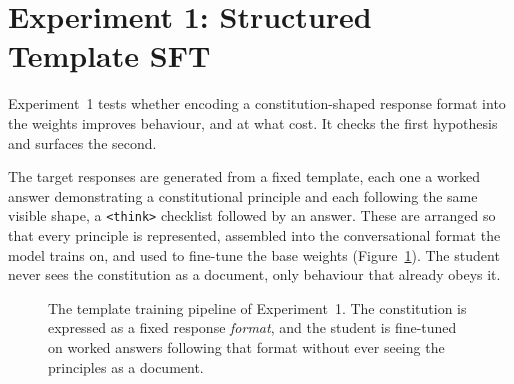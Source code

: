 \section{Experiment 1: Structured Template SFT}
\label{sec:mr-exp1}
\label{subsec:mr-exp1-results}

Experiment~1 tests whether encoding a constitution-shaped response format into the weights improves behaviour, and at what cost. It checks the first hypothesis and surfaces the second.

The target responses are generated from a fixed template, each one a worked answer demonstrating a constitutional principle and each following the same visible shape, a \texttt{<think>} checklist followed by an answer. These are arranged so that every principle is represented, assembled into the conversational format the model trains on, and used to fine-tune the base weights (Figure~\ref{fig:sft-pipeline-template}). The student never sees the constitution as a document, only behaviour that already obeys it.

\begin{figure}[H]
  \centering
  \caption[The template training pipeline of Experiment~1]{The template training pipeline of Experiment~1. The constitution is expressed as a fixed response \emph{format}, and the student is fine-tuned on worked answers following that format without ever seeing the principles as a document.}
  \label{fig:sft-pipeline-template}
\end{figure}

